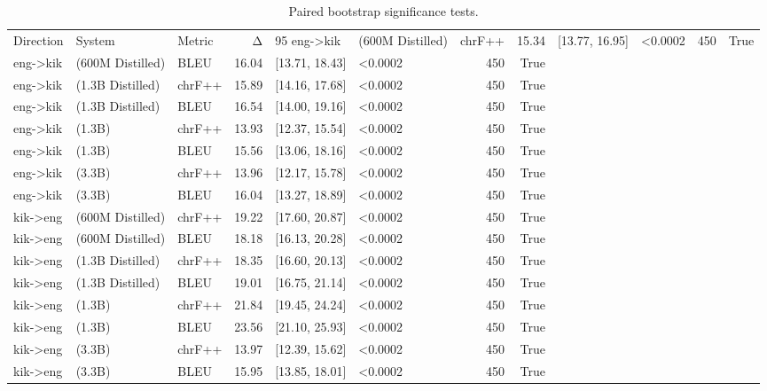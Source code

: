 \begin{table}
\caption{Paired bootstrap significance tests.}
\label{tab:bootstrap}
\begin{tabular}{lllrllrr}
\toprule
Direction & System & Metric & Δ & 95%
\midrule
eng->kik & (600M Distilled) & chrF++ & 15.34 & [13.77, 16.95] & <0.0002 & 450 & True \\
eng->kik & (600M Distilled) & BLEU & 16.04 & [13.71, 18.43] & <0.0002 & 450 & True \\
eng->kik & (1.3B Distilled) & chrF++ & 15.89 & [14.16, 17.68] & <0.0002 & 450 & True \\
eng->kik & (1.3B Distilled) & BLEU & 16.54 & [14.00, 19.16] & <0.0002 & 450 & True \\
eng->kik & (1.3B) & chrF++ & 13.93 & [12.37, 15.54] & <0.0002 & 450 & True \\
eng->kik & (1.3B) & BLEU & 15.56 & [13.06, 18.16] & <0.0002 & 450 & True \\
eng->kik & (3.3B) & chrF++ & 13.96 & [12.17, 15.78] & <0.0002 & 450 & True \\
eng->kik & (3.3B) & BLEU & 16.04 & [13.27, 18.89] & <0.0002 & 450 & True \\
kik->eng & (600M Distilled) & chrF++ & 19.22 & [17.60, 20.87] & <0.0002 & 450 & True \\
kik->eng & (600M Distilled) & BLEU & 18.18 & [16.13, 20.28] & <0.0002 & 450 & True \\
kik->eng & (1.3B Distilled) & chrF++ & 18.35 & [16.60, 20.13] & <0.0002 & 450 & True \\
kik->eng & (1.3B Distilled) & BLEU & 19.01 & [16.75, 21.14] & <0.0002 & 450 & True \\
kik->eng & (1.3B) & chrF++ & 21.84 & [19.45, 24.24] & <0.0002 & 450 & True \\
kik->eng & (1.3B) & BLEU & 23.56 & [21.10, 25.93] & <0.0002 & 450 & True \\
kik->eng & (3.3B) & chrF++ & 13.97 & [12.39, 15.62] & <0.0002 & 450 & True \\
kik->eng & (3.3B) & BLEU & 15.95 & [13.85, 18.01] & <0.0002 & 450 & True \\
\bottomrule
\end{tabular}
\end{table}
